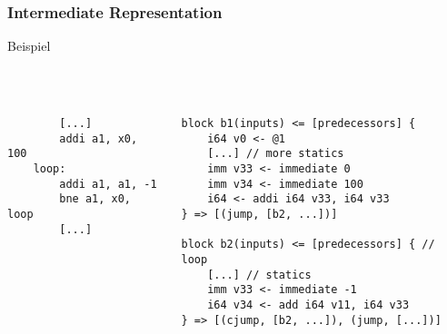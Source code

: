 \begin{frame}[fragile]
    \frametitle{Intermediate Representation}{Beispiel}
    \pause
    ~\\
    ~\\
    ~\\
    \begin{columns}[c]
        \begin{lstlisting}
        [...]
        addi a1, x0, 100
    loop:
        addi a1, a1, -1
        bne a1, x0, loop
        [...]
        \end{lstlisting}

        \pause

        \pause

        \begin{lstlisting}
block b1(inputs) <= [predecessors] {
    i64 v0 <- @1
    [...] // more statics
    imm v33 <- immediate 0
    imm v34 <- immediate 100
    i64 <- addi i64 v33, i64 v33
} => [(jump, [b2, ...])]

block b2(inputs) <= [predecessors] { // loop
    [...] // statics
    imm v33 <- immediate -1
    i64 v34 <- add i64 v11, i64 v33
} => [(cjump, [b2, ...]), (jump, [...])]
    \end{lstlisting}
    \end{columns}

\end{frame}
\clearpage



